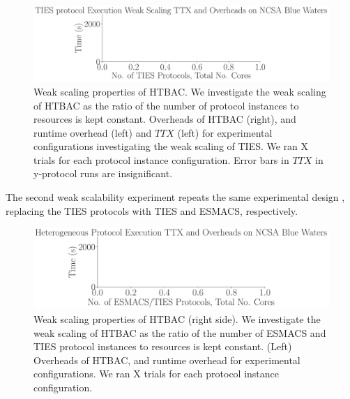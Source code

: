 \begin{figure}
  \centering
    \includegraphics[width=\columnwidth]{figures/ties_ws_pseudo.pdf}
    \caption{Weak scaling properties of HTBAC. We investigate the weak
    scaling of HTBAC as the ratio of the number of protocol instances to
    resources is kept constant. Overheads of HTBAC (right), and runtime
    overhead (left) and \(TTX\) (left) for experimental configurations
    investigating the weak scaling of TIES. We ran X trials for each protocol
    instance configuration. Error bars in \(TTX\) in y-protocol runs are
    insignificant.}
\label{fig:weak_scaling_TIES}
\end{figure}

The second weak scalability experiment repeats the same experimental design
, replacing the TIES protocols  with TIES and ESMACS, respectively. 

\begin{figure}
  \centering
    \includegraphics[width=\columnwidth]{figures/esmacs_ties_ws_pseudo.pdf}
    \caption{Weak scaling properties of HTBAC (right side). We investigate
    the weak scaling of HTBAC as the ratio of the number of ESMACS and TIES
    protocol instances to resources is kept constant. (Left) Overheads of
    HTBAC, and runtime overhead for experimental configurations. We ran X
    trials for each protocol instance configuration.}
\label{fig:weak_scaling_ESMACS_TIES}
\end{figure}

